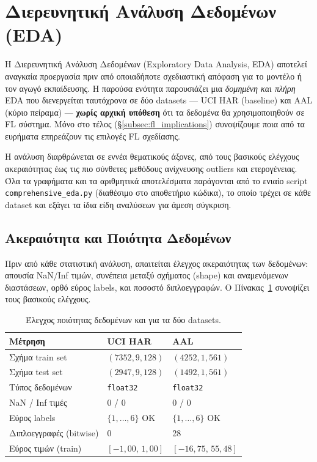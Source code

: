 
\section{Διερευνητική Ανάλυση Δεδομένων (EDA)}
\label{sec:eda}

Η Διερευνητική Ανάλυση Δεδομένων (Exploratory Data Analysis, EDA)
αποτελεί αναγκαία προεργασία πριν από οποιαδήποτε σχεδιαστική
απόφαση για το μοντέλο ή τον αγωγό εκπαίδευσης. Η παρούσα ενότητα
παρουσιάζει μια \textit{δομημένη και πλήρη} EDA που διενεργείται
ταυτόχρονα σε δύο datasets — UCI HAR (baseline) και AAL
(κύριο πείραμα) — \textbf{χωρίς αρχική υπόθεση} ότι τα δεδομένα
θα χρησιμοποιηθούν σε FL σύστημα. Μόνο στο τέλος (§\ref{subsec:fl_implications})
συνοψίζουμε ποια από τα ευρήματα επηρεάζουν τις επιλογές FL
σχεδίασης.

Η ανάλυση διαρθρώνεται σε εννέα θεματικούς άξονες, από τους
βασικούς ελέγχους ακεραιότητας έως τις πιο σύνθετες μεθόδους
ανίχνευσης outliers και ετερογένειας. Όλα τα γραφήματα και τα
αριθμητικά αποτελέσματα παράγονται από το ενιαίο script
\texttt{comprehensive\_eda.py} (διαθέσιμο στο αποθετήριο κώδικα), το οποίο
τρέχει σε κάθε dataset και εξάγει τα ίδια είδη αναλύσεων για
άμεση σύγκριση.

\subsection{Ακεραιότητα και Ποιότητα Δεδομένων}
\label{subsec:data_quality}

Πριν από κάθε στατιστική ανάλυση, απαιτείται έλεγχος ακεραιότητας
των δεδομένων: απουσία NaN/Inf τιμών, συνέπεια μεταξύ
σχήματος (shape) και αναμενόμενων διαστάσεων, ορθό εύρος labels,
και ποσοστό διπλοεγγραφών. Ο Πίνακας~\ref{tab:data_quality}
συνοψίζει τους βασικούς ελέγχους.

\begin{table}[H]
    \centering
    \caption{Έλεγχος ποιότητας δεδομένων και για τα δύο datasets.}
    \label{tab:data_quality}
    \small
    \begin{tabular}{lll}
        \toprule
        \textbf{Μέτρηση} & \textbf{UCI HAR} & \textbf{AAL} \\
        \midrule
        Σχήμα train set          & $(7352, 9, 128)$     & $(4252, 1, 561)$ \\
        Σχήμα test set           & $(2947, 9, 128)$     & $(1492, 1, 561)$ \\
        Τύπος δεδομένων          & \texttt{float32}     & \texttt{float32} \\
        NaN / Inf τιμές          & 0 / 0                & 0 / 0 \\
        Εύρος labels             & $\{1,\dots,6\}$ ΟΚ & $\{1,\dots,6\}$ ΟΚ \\
        Διπλοεγγραφές (bitwise)  & 0                     & 28 \\
        Εύρος τιμών (train)      & $[-1{,}00,\, 1{,}00]$ & $[-16{,}75,\, 55{,}48]$ \\
        \bottomrule
    \end{tabular}
\end{table}

